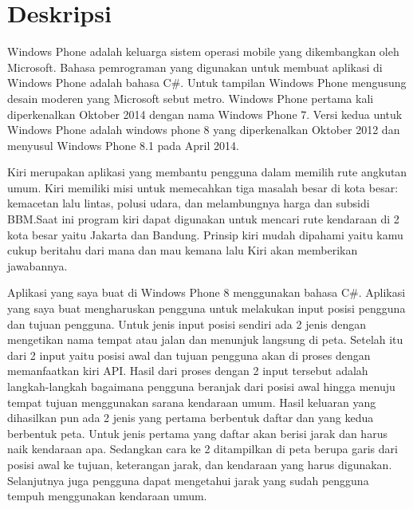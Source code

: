 \documentclass[a4paper,twoside]{article}
\begin{document}
\title{\@judultopik}
\author{\nama \textendash \@npm} 

\newcommand{\nama}{Yohan}
\newcommand{\@npm}{2011730048}
\newcommand{\@judultopik}{Pencari Rute Kendaraan Umum untuk Windows Phone} %
\newcommand{\jumpemb}{1} %
\newcommand{\tanggal}{08/06/2014}
\maketitle


\section{Deskripsi}
Windows Phone adalah keluarga sistem operasi mobile yang dikembangkan oleh Microsoft. Bahasa pemrograman yang digunakan untuk membuat aplikasi di Windows Phone adalah bahasa C\#. Untuk tampilan Windows Phone mengusung desain moderen yang Microsoft sebut metro. Windows Phone pertama kali diperkenalkan Oktober 2014 dengan nama Windows Phone 7. Versi kedua untuk Windows Phone adalah windows phone 8 yang diperkenalkan Oktober 2012 dan menyusul Windows Phone 8.1 pada April 2014.\footnotemark[1]

Kiri merupakan aplikasi yang membantu pengguna dalam memilih rute angkutan umum. Kiri memiliki misi untuk memecahkan tiga masalah besar di kota besar: kemacetan lalu lintas, polusi udara, dan melambungnya harga dan subsidi BBM.\footnotemark[2] Saat ini program kiri dapat digunakan untuk mencari rute kendaraan di 2 kota besar yaitu Jakarta dan Bandung. Prinsip kiri mudah dipahami yaitu kamu cukup beritahu dari mana dan mau kemana lalu Kiri akan memberikan jawabannya.

Aplikasi yang saya buat di Windows Phone 8 menggunakan bahasa C\#. Aplikasi yang saya buat mengharuskan pengguna untuk melakukan input posisi pengguna dan tujuan pengguna. Untuk jenis input posisi sendiri ada 2 jenis dengan mengetikan nama tempat atau jalan dan menunjuk langsung di peta. Setelah itu dari 2 input yaitu posisi awal dan tujuan pengguna akan di proses dengan memanfaatkan kiri API. Hasil dari proses dengan 2 input tersebut adalah langkah-langkah bagaimana pengguna beranjak dari posisi awal hingga menuju tempat tujuan menggunakan sarana kendaraan umum. Hasil keluaran yang dihasilkan pun ada 2 jenis yang pertama berbentuk daftar dan yang kedua berbentuk peta. Untuk jenis pertama yang daftar akan berisi jarak dan harus naik kendaraan apa. Sedangkan cara ke 2 ditampilkan di peta berupa garis dari posisi awal ke tujuan, keterangan jarak, dan kendaraan yang harus digunakan. Selanjutnya juga pengguna dapat mengetahui jarak yang sudah pengguna tempuh menggunakan kendaraan umum.
\end{document}
